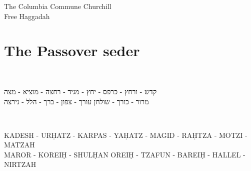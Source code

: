 \documentclass[a4paper,12pt,openany]{memoir}
\newenvironment{HgTranslit}{\strut\\\noindent\begin{itshape}}{\end{itshape}\vspace{1em}}
\newenvironment{HgHebrew}{\begin{hebrew}\strut\\\noindent\Large}{\end{hebrew}}
\begin{document}
\pagestyle{empty}
\strut
\vfill

\begin{center}
\fontsize{22pt}{22pt}
\selectfont
The 
Columbia
Commune
Churchill \\
\fontsize{50pt}{50pt}
\selectfont
Free 
Haggadah
\end{center}
\vspace{10em}
\vfill

%
%

\chapter*{The Passover seder}

\vfill

\vspace{-2em}
\begin{HgHebrew}
  \begin{center}
  קדש 
  -
  ורחץ
  -
  כרפס 
  -
  יחץ 
  -
  מגיד 
  -
  רחצה 
  -
  מוציא
  -
  מצה 
  \\
  מרור 
  -
  כורך 
  -
  שולחן עורך 
  -
  צפון
  -
  ברך 
  -
  הלל 
  -
  נירצה 
  \end{center}
\end{HgHebrew}
\vspace{-3em}
\begin{HgTranslit}
  \begin{center}
  {\small 
    KADESH - UR\d{H}ATZ - KARPAS - YA\d{H}ATZ - %
    MAGID - RA\d{H}TZA - MOTZI - MATZAH \\ 
    MAROR - KOREI\d{H} - SHUL\d{H}AN OREI\d{H} - %
    TZAFUN - BAREI\d{H} - HALLEL - NIRTZAH}
  \end{center}
\end{HgTranslit}
\end{document}
